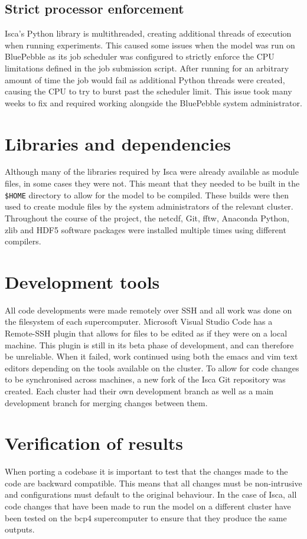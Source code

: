 \documentclass[a4paper,11pt]{report}
\begin{document}
\subsection{Strict processor enforcement}
Isca's Python library is multithreaded, creating additional threads of execution when running experiments. This caused some issues when the model was run on BluePebble as its job scheduler was configured to strictly enforce the CPU limitations defined in the job submission script. After running for an arbitrary amount of time the job would fail as additional Python threads were created, causing the CPU to try to burst past the scheduler limit. This issue took many weeks to fix and required working alongside the BluePebble system administrator. 



\section{Libraries and dependencies}
Although many of the libraries required by Isca were already available as module files, in some cases they were not. This meant that they needed to be built in the \texttt{\$HOME} directory to allow for the model to be compiled. These builds were then used to create module files by the system administrators of the relevant cluster. Throughout the course of the project, the \gls{netcdf}, Git, \gls{fftw}, Anaconda Python, zlib and HDF5 software packages were installed multiple times using different compilers. 

\section{Development tools}
All code developments were made remotely over SSH and all work was done on the filesystem of each supercomputer. Microsoft Visual Studio Code has a Remote-SSH plugin that allows for files to be edited as if they were on a local machine. This plugin is still in its beta phase of development, and can therefore be unreliable. When it failed, work continued using both the emacs and vim text editors depending on the tools available on the cluster. To allow for code changes to be synchronised across machines, a new fork of the Isca Git repository was created. Each cluster had their own development branch as well as a main development branch for merging changes between them. 



\section{Verification of results}
When porting a codebase it is important to test that the changes made to the code are backward compatible. This means that all changes must be non-intrusive and configurations must default to the original behaviour. In the case of Isca, all code changes that have been made to run the model on a different cluster have been tested on the \gls{bcp4} supercomputer to ensure that they produce the same outputs.
\end{document}
